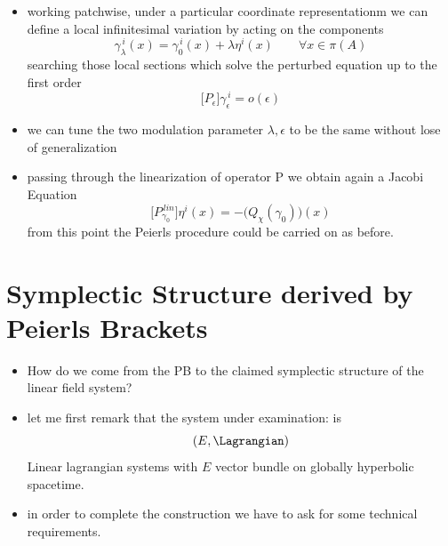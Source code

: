 \documentclass[a4paper,11pt]{scrartcl}
\begin{document}
\begin{itemize}
		\item working patchwise, under a particular coordinate representationm we can define a local infinitesimal variation by acting on the components
		$$\gamma_\lambda ^{\, i}(x) = \gamma_0^{\, i}(x) + \lambda \eta^i(x) \qquad \forall x\in \pi(A) $$
		searching those local sections  which solve the perturbed equation up to the first order
		$$\big[ P_\epsilon \big] \gamma_\epsilon^{\,i} = o(\epsilon)$$
		\item we can tune the two modulation parameter $\lambda, \epsilon$ to be the same without lose of generalization
		\item passing through the linearization of operator P we obtain again a Jacobi Equation
		$$\biggr[P_{\gamma_0}^{\, lin} \biggr] \eta^i(x) = -\biggr(Q_\chi(\gamma_0)\biggr)(x)$$
		from this point the Peierls procedure could be carried on as before.
	\end{itemize}
	\newpage
	\section{Symplectic Structure derived by Peierls Brackets}
	\begin{itemize}
		\item How do we come from the PB to the claimed symplectic structure of the linear field system?
		\item let me first remark that the system under examination: is $$(E,\Lagrangian)$$ Linear lagrangian systems with $E$ vector bundle on globally hyperbolic spacetime.
		
		\item in order to complete the construction we have to ask for some technical requirements. 
	\end{itemize}
\end{document}

